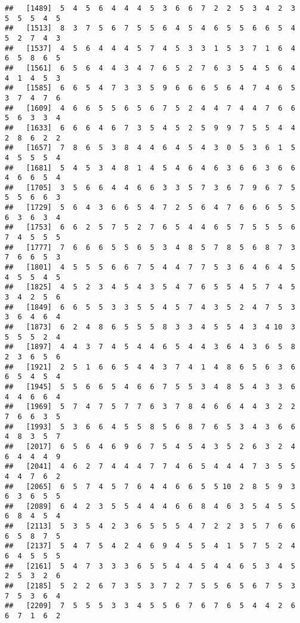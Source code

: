 \documentclass[
]{book}
\begin{document}
\begin{verbatim}
##   [1489]  5  4  5  6  4  4  4  5  3  6  6  7  2  2  5  3  4  2  3  5  5  5  4  5
##   [1513]  8  3  7  5  6  7  5  5  6  4  5  4  6  5  5  6  6  5  4  5  2  7  4  3
##   [1537]  4  5  6  4  4  4  5  7  4  5  3  3  1  5  3  7  1  6  4  6  5  8  6  5
##   [1561]  6  5  6  4  4  3  4  7  6  5  2  7  6  3  5  4  5  6  4  4  1  4  5  3
##   [1585]  6  6  5  4  7  3  3  5  9  6  6  6  5  6  4  7  4  6  5  3  7  4  7  6
##   [1609]  4  6  6  5  5  6  5  6  7  5  2  4  4  7  4  4  7  6  6  5  6  3  3  4
##   [1633]  6  6  6  4  6  7  3  5  4  5  2  5  9  9  7  5  5  4  4  2  8  6  2  2
##   [1657]  7  8  6  5  3  8  4  4  6  4  5  4  3  0  5  3  6  1  5  4  5  5  5  4
##   [1681]  5  4  5  3  4  8  1  4  5  4  6  4  6  3  6  6  3  6  6  4  6  6  5  4
##   [1705]  3  5  6  6  4  4  6  6  3  3  5  7  3  6  7  9  6  7  5  5  5  6  6  3
##   [1729]  5  6  4  3  6  6  5  4  7  2  5  6  4  7  6  6  6  5  5  6  3  6  3  4
##   [1753]  6  6  2  5  7  5  2  7  6  5  4  4  6  5  7  5  5  5  6  7  4  5  5  5
##   [1777]  7  6  6  6  5  5  6  5  3  4  8  5  7  8  5  6  8  7  3  7  6  6  5  3
##   [1801]  4  5  5  5  6  6  7  5  4  4  7  7  5  3  6  4  6  4  5  4  5  5  4  5
##   [1825]  4  5  2  3  4  5  4  3  5  4  7  6  5  5  4  5  7  4  5  3  4  2  5  6
##   [1849]  6  6  5  5  3  3  5  5  4  5  7  4  3  5  2  4  7  5  3  3  6  4  6  4
##   [1873]  6  2  4  8  6  5  5  5  8  3  3  4  5  5  4  3  4 10  3  5  5  5  2  4
##   [1897]  4  4  3  7  4  5  4  4  6  5  4  4  3  6  4  3  6  5  8  2  3  6  5  6
##   [1921]  2  5  1  6  6  5  4  4  3  7  4  1  4  8  6  5  6  3  6  6  5  4  5  4
##   [1945]  5  5  6  6  5  4  6  6  7  5  5  3  4  8  5  4  3  3  6  4  4  6  6  4
##   [1969]  5  7  4  7  5  7  7  6  3  7  8  4  6  6  4  4  3  2  2  7  6  6  3  5
##   [1993]  5  3  6  6  4  5  5  8  5  6  8  7  6  5  3  4  3  6  6  4  8  3  5  7
##   [2017]  6  5  6  4  6  9  6  7  5  4  5  4  3  5  2  6  3  2  4  6  4  4  4  9
##   [2041]  4  6  2  7  4  4  4  7  7  4  6  5  4  4  4  7  3  5  5  4  4  7  6  2
##   [2065]  6  5  7  4  5  7  6  4  4  6  6  5  5 10  2  8  5  9  3  6  3  6  5  5
##   [2089]  6  4  2  3  5  5  4  4  4  6  6  8  4  6  3  5  4  5  5  6  8  4  5  4
##   [2113]  5  3  5  4  2  3  6  5  5  5  4  7  2  2  3  5  7  6  6  6  5  8  7  5
##   [2137]  5  4  7  5  4  2  4  6  9  4  5  5  4  1  5  7  5  2  4  6  4  5  5  5
##   [2161]  5  4  7  3  3  3  6  5  5  4  4  5  4  4  6  5  3  4  5  2  5  3  2  6
##   [2185]  5  2  2  6  7  3  5  3  7  2  7  5  5  6  5  6  7  5  3  7  5  3  6  4
##   [2209]  7  5  5  5  3  3  4  5  5  6  7  6  7  6  5  4  4  2  6  6  7  1  6  2

\end{verbatim}
\end{document}
